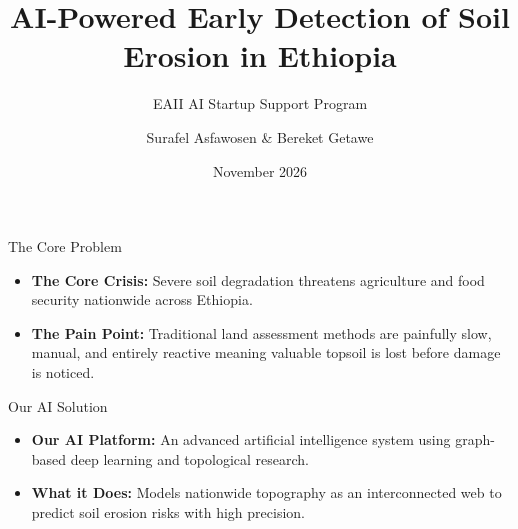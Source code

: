 \documentclass[aspectratio=43]{beamer}
\title[AI-Powered Early Detection of Soil Erosion in Ethiopia]{AI-Powered Early Detection of Soil Erosion in Ethiopia}
\subtitle{EAII AI Startup Support Program}
\author[Surafel Asfawosen \& Bereket Getawe]{Surafel Asfawosen \& Bereket Getawe}
\institute[]{Startup & Research Initiative}
\date[November 2026]{November 2026}
\begin{document}
\begin{frame}
    \titlepage
\end{frame}

\begin{frame}{The Core Problem}
    \vspace{0.6cm}
    \begin{itemize}
        \setlength\itemsep{1.5em}
        \item \textbf{The Core Crisis:} Severe soil degradation threatens agriculture and food security nationwide across Ethiopia.
        \item \textbf{The Pain Point:} Traditional land assessment methods are painfully slow, manual, and entirely reactive meaning valuable topsoil is lost before damage is noticed.
    \end{itemize}
\end{frame}

\begin{frame}{Our AI Solution}
    \vspace{0.6cm}
    \begin{itemize}
        \setlength\itemsep{1.5em}
        \item \textbf{Our AI Platform:} An advanced artificial intelligence system using graph-based deep learning and topological research.
        \item \textbf{What it Does:} Models nationwide topography as an interconnected web to predict soil erosion risks with high precision.
    \end{itemize}
\end{frame}
\end{document}
